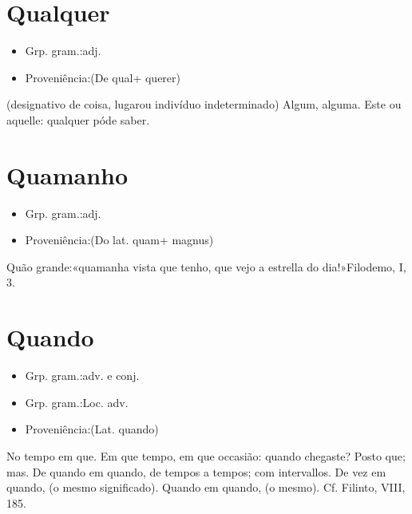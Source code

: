 \section{Qualquer}
\begin{itemize}
\item {Grp. gram.:adj.}
\end{itemize}
\begin{itemize}
\item {Proveniência:(De \textunderscore qual\textunderscore  + \textunderscore querer\textunderscore )}
\end{itemize}
(designativo de \textunderscore coisa\textunderscore , \textunderscore lugar\textunderscore  ou \textunderscore indivíduo indeterminado\textunderscore )
Algum, alguma.
Este ou aquelle: \textunderscore qualquer póde saber\textunderscore .
\section{Quamanho}
\begin{itemize}
\item {Grp. gram.:adj.}
\end{itemize}
\begin{itemize}
\item {Proveniência:(Do lat. \textunderscore quam\textunderscore  + \textunderscore magnus\textunderscore )}
\end{itemize}
Quão grande:«\textunderscore quamanha vista que tenho, que vejo a estrella do dia!\textunderscore »\textunderscore Filodemo\textunderscore , I, 3.
\section{Quando}
\begin{itemize}
\item {Grp. gram.:adv.  e  conj.}
\end{itemize}
\begin{itemize}
\item {Grp. gram.:Loc. adv.}
\end{itemize}
\begin{itemize}
\item {Proveniência:(Lat. \textunderscore quando\textunderscore )}
\end{itemize}
No tempo em que.
Em que tempo, em que occasião: \textunderscore quando chegaste\textunderscore ?
Posto que; mas.
\textunderscore De quando em quando\textunderscore , de tempos a tempos; com intervallos.
\textunderscore De vez em quando\textunderscore , (o mesmo significado).
\textunderscore Quando em quando\textunderscore , (o mesmo). Cf. Filinto, VIII, 185.
